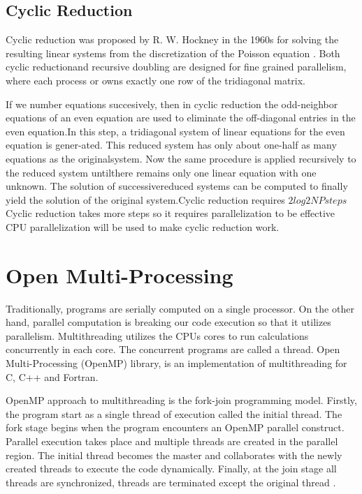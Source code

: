 \documentclass[12pt, oneside]{book}
\theoremstyle{plain}
\theoremstyle{definition}
\begin{document}
\subsection{Cyclic Reduction}\label{cyclic}
Cyclic reduction was proposed by R. W. Hockney in the 1960s for solving the resulting linear systems from the  discretization of the Poisson equation \cite{Hockney}. 
Both cyclic reductionand recursive doubling are designed for fine grained parallelism, where each process or owns exactly one row of the tridiagonal matrix. 

If we number equations succesively, then in cyclic reduction the odd-neighbor equations of an even equation are used to eliminate the off-diagonal entries in the even equation.In this step, a tridiagonal system of linear equations for the even equation is gener-ated. This reduced system has only about one-half as many equations as the originalsystem. Now the same procedure is applied recursively to the reduced system untilthere remains only one linear equation with one unknown. The solution of successivereduced systems can be computed to finally yield the solution of the original system.Cyclic reduction requires $2log2NPsteps$
Cyclic reduction takes more steps so it requires parallelization to be effective CPU parallelization will be used to make cyclic reduction work.

\section{Open Multi-Processing}
Traditionally, programs are serially computed on a single processor. On the other hand, parallel computation is breaking our code execution so that it utilizes parallelism. Multithreading utilizes the CPUs cores to run calculations concurrently in each core. The concurrent programs are called a thread.  Open Multi-Processing (OpenMP) library, is an implementation of multithreading for C, C++ and Fortran. 

OpenMP approach to multithreading is the fork-join programming model. Firstly, the program start as a single thread of execution called the initial thread. The fork stage begins when the program encounters an OpenMP parallel construct. Parallel execution takes place and multiple threads are created in the parallel region. The initial thread becomes the master and collaborates with the newly created threads to execute the code dynamically. Finally, at the join stage all threads are synchronized, threads are terminated except the original thread \cite{openmp}.
\end{document}
